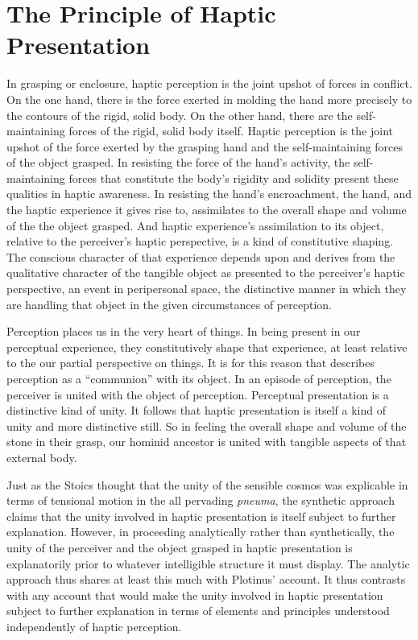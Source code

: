 
\section{The Principle of Haptic Presentation} %
\label{sec:sympathy_as_the_principle_of_haptic_presentation}

In grasping or enclosure, haptic perception is the joint upshot of forces in conflict. On the one hand, there is the force exerted in molding the hand more precisely to the contours of the rigid, solid body. On the other hand, there are the self-maintaining forces of the rigid, solid body itself. Haptic perception is the joint upshot of the force exerted by the grasping hand and the self-maintaining forces of the object grasped. In resisting the force of the hand's activity, the self-maintaining forces that constitute the body's rigidity and solidity present these qualities in haptic awareness. In resisting the hand's encroachment, the hand, and the haptic experience it gives rise to, assimilates to the overall shape and volume of the the object grasped. And haptic experience's assimilation to its object, relative to the perceiver's haptic perspective, is a kind of constitutive shaping. The conscious character of that experience depends upon and derives from the qualitative character of the tangible object as presented to the perceiver's haptic perspective, an event in peripersonal space, the distinctive manner in which they are handling that object in the given circumstances of perception.

Perception places us in the very heart of things. In being present in our perceptual experience, they constitutively shape that experience, at least relative to the our partial perspective on things. It is for this reason that \citet{Ardley:1958aa} describes perception as a ``communion'' with its object. In an episode of perception, the perceiver is united with the object of perception. Perceptual presentation is a distinctive kind of unity. It follows that haptic presentation is itself a kind of unity and more distinctive still. So in feeling the overall shape and volume of the stone in their grasp, our hominid ancestor is united with tangible aspects of that external body.

Just as the Stoics thought that the unity of the sensible cosmos was explicable in terms of tensional motion in the all pervading \emph{pneuma}, the synthetic approach claims that the unity involved in haptic presentation is itself subject to further explanation. However, in proceeding analytically rather than synthetically, the unity of the perceiver and the object grasped in haptic presentation is explanatorily prior to whatever intelligible structure it must display. The analytic approach thus shares at least this much with Plotinus' account. It thus contrasts with any account that would make the unity involved in haptic presentation subject to further explanation in terms of elements and principles understood independently of haptic perception. 

